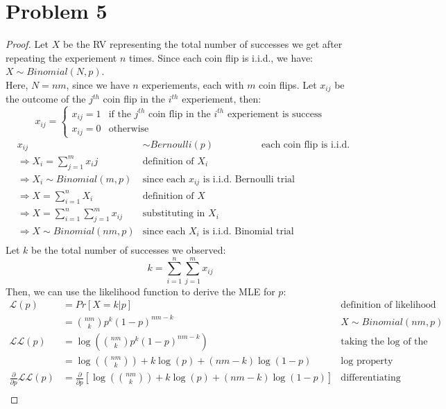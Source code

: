 \documentclass[11pt]{article}
\newcommand{\pd}[1]{\frac{\partial}{\partial #1}}
\begin{document}
\section*{Problem 5}
\begin{proof}
	Let $X$ be the RV representing the total number of successes we get after repeating the experiement $n$ times. Since each coin flip is i.i.d., we have:
	$X \sim Binomial(N, p)$. \\
	Here, $N = nm$, since we have $n$ experiements, each with $m$ coin flips. 
	Let $x_{ij}$ be the outcome of the $j^{th}$ coin flip in the $i^{th}$ experiement, then:
	\[
		x_{ij} = \begin{cases}
			x_{ij} = 1 & \text{if the } j^{th} \text{ coin flip in the } i^{th} \text{ experiement is success} \\
			x_{ij} = 0 & \text{otherwise}
		\end{cases}
	\]
	\begin{align*}
		& x_{ij} & \sim Bernoulli(p) & \text{each coin flip is i.i.d. Bernoulli trial} \\
		&\Rightarrow X_i = \sum_{j=1}^{m} x_ij & \text{definition of } X_i \\
		&\Rightarrow X_i \sim Binomial(m, p) & \text{since each } x_{ij} \text{ is i.i.d. Bernoulli trial} \\
		&\Rightarrow X = \sum_{i=1}^{n} X_i & \text{definition of } X \\
		&\Rightarrow X = \sum_{i=1}^{n} \sum_{j=1}^{m} x_{ij} & \text{substituting in } X_i \\
		&\Rightarrow X  \sim Binomial(nm, p) & \text{since each } X_i \text{ is i.i.d. Binomial trial} \\
	\end{align*}
	Let $k$ be the total number of successes we observed:
	\[
	k = \sum_{i=1}^{n} \sum_{j=1}^{m} x_{ij}
	\]
	Then, we can use the likelihood function to derive the MLE for $p$:
	\begin{align*}
		\mathcal{L}(p) &= Pr[X = k | p] & \text{definition of likelihood function} \\
		&= {nm \choose k} p^k (1 - p)^{nm - k} & X \sim Binomial(nm, p) \\
		\mathcal{L}\mathcal{L}(p) &= \log \left( {nm \choose k} p^k (1 - p)^{nm - k} \right) & \text{taking the log of the likelihood function} \\
		&= \log \left( {nm \choose k} \right) + k \log(p) + (nm - k) \log(1 - p) & \text{log property} \\
		\pd{p} \mathcal{L}\mathcal{L}(p) &= \pd{p} \left[ \log \left( {nm \choose k} \right) + k \log(p) + (nm - k) \log(1 - p) \right] & \text{differentiating} \\

\end{align*}
\end{proof}
\end{document}
